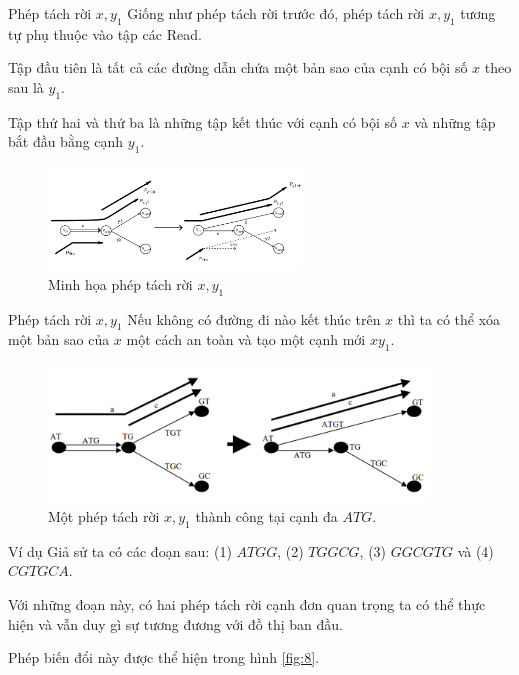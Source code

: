 \documentclass[10pt]{beamer}
\theoremstyle{remark}
\numberwithin{algocf}{section}
\numberwithin{equation}{section}
\numberwithin{dl}{section}
\numberwithin{figure}{section}
\begin{document}
\begin{frame}{Phép tách rời $x, y_1$}
    Giống như phép tách rời trước đó, phép tách rời $x, y_1$ tương tự phụ thuộc vào tập các Read.

    Tập đầu tiên là tất cả các đường dẫn chứa một bản sao của cạnh có bội số $x$ theo sau là $y_1$.

    Tập thứ hai và thứ ba là những tập kết thúc với cạnh có bội số $x$ và những tập bắt đầu bằng cạnh $y_1$.

    \begin{figure}[h!]
        \centering
        \includegraphics[width=0.6\textwidth]{figures/xy1_detachment.png}
        \caption{Minh họa phép tách rời $x, y_1$ \cite{pevzner2001new}}
    \end{figure}
\end{frame}

\begin{frame}{Phép tách rời $x, y_1$}
    Nếu không có đường đi nào kết thúc trên $x$ thì ta có thể xóa một bản sao của $x$ một cách an toàn và tạo một cạnh mới $xy_1$.

    \begin{figure}[h!]
        \centering
        \includegraphics[width=0.9\textwidth]{7.png}
        \caption{Một phép tách rời $x, y_1$ thành công tại cạnh đa $ATG$.}
        \label{fig:7}
    \end{figure}
\end{frame}

\begin{frame}{Ví dụ}
    Giả sử ta có các đoạn sau: (1) $ATGG$, (2) $TGGCG$, (3) $GGCGTG$ và (4) $CGTGCA$.

    Với những đoạn này, có hai phép tách rời cạnh đơn quan trọng ta có thể thực hiện và vẫn duy gì sự tương đương với đồ thị ban đầu.

    Phép biến đổi này được thể hiện trong hình \ref{fig:8}.

    
\end{frame}
\end{document}
